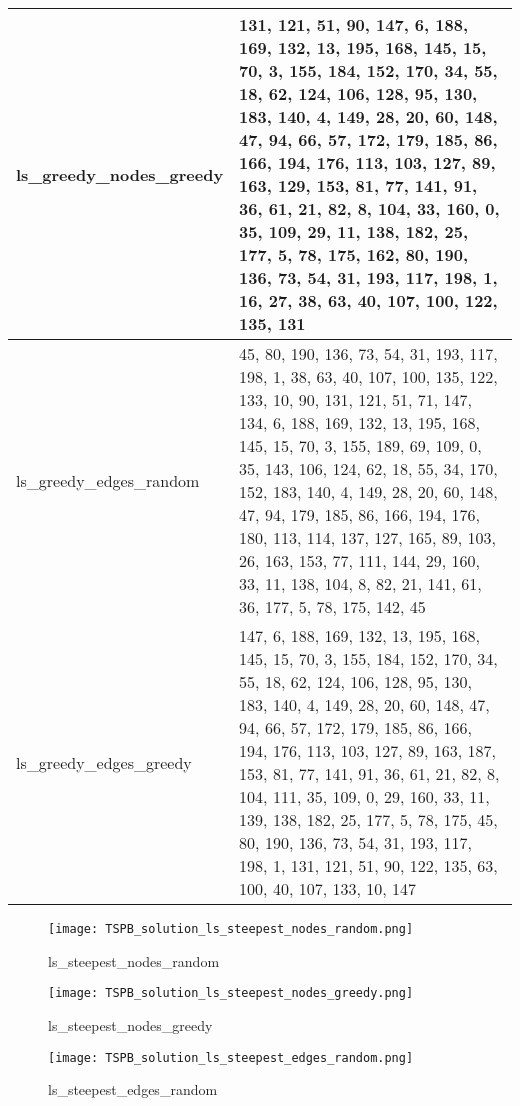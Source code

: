 \begin{table}[H]
\begin{tabular}{|p{0.25\linewidth}|p{0.75\linewidth}|}
\hline
ls\_greedy\_nodes\_greedy & 131, 121, 51, 90, 147, 6, 188, 169, 132, 13, 195, 168, 145, 15, 70, 3, 155, 184, 152, 170, 34, 55, 18, 62, 124, 106, 128, 95, 130, 183, 140, 4, 149, 28, 20, 60, 148, 47, 94, 66, 57, 172, 179, 185, 86, 166, 194, 176, 113, 103, 127, 89, 163, 129, 153, 81, 77, 141, 91, 36, 61, 21, 82, 8, 104, 33, 160, 0, 35, 109, 29, 11, 138, 182, 25, 177, 5, 78, 175, 162, 80, 190, 136, 73, 54, 31, 193, 117, 198, 1, 16, 27, 38, 63, 40, 107, 100, 122, 135, 131 \\
\hline
ls\_greedy\_edges\_random & 45, 80, 190, 136, 73, 54, 31, 193, 117, 198, 1, 38, 63, 40, 107, 100, 135, 122, 133, 10, 90, 131, 121, 51, 71, 147, 134, 6, 188, 169, 132, 13, 195, 168, 145, 15, 70, 3, 155, 189, 69, 109, 0, 35, 143, 106, 124, 62, 18, 55, 34, 170, 152, 183, 140, 4, 149, 28, 20, 60, 148, 47, 94, 179, 185, 86, 166, 194, 176, 180, 113, 114, 137, 127, 165, 89, 103, 26, 163, 153, 77, 111, 144, 29, 160, 33, 11, 138, 104, 8, 82, 21, 141, 61, 36, 177, 5, 78, 175, 142, 45 \\
\hline
ls\_greedy\_edges\_greedy & 147, 6, 188, 169, 132, 13, 195, 168, 145, 15, 70, 3, 155, 184, 152, 170, 34, 55, 18, 62, 124, 106, 128, 95, 130, 183, 140, 4, 149, 28, 20, 60, 148, 47, 94, 66, 57, 172, 179, 185, 86, 166, 194, 176, 113, 103, 127, 89, 163, 187, 153, 81, 77, 141, 91, 36, 61, 21, 82, 8, 104, 111, 35, 109, 0, 29, 160, 33, 11, 139, 138, 182, 25, 177, 5, 78, 175, 45, 80, 190, 136, 73, 54, 31, 193, 117, 198, 1, 131, 121, 51, 90, 122, 135, 63, 100, 40, 107, 133, 10, 147 \\
\hline
\end{tabular}
\end{table}


\begin{figure}[!htbp]
\centering
\texttt{[image: TSPB\_solution\_ls\_steepest\_nodes\_random.png]}
\caption{\label{fig:frog}ls\_steepest\_nodes\_random}
\end{figure}

\begin{figure}[!htbp]
\centering
\texttt{[image: TSPB\_solution\_ls\_steepest\_nodes\_greedy.png]}
\caption{\label{fig:frog}ls\_steepest\_nodes\_greedy}
\end{figure}

\begin{figure}[!htbp]
\centering
\texttt{[image: TSPB\_solution\_ls\_steepest\_edges\_random.png]}
\caption{\label{fig:frog}ls\_steepest\_edges\_random}
\end{figure}

